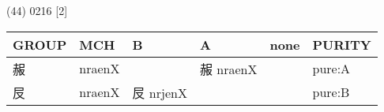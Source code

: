 \documentclass[14pt,a4paper]{scrartcl}
\begin{document}
(44) 0216 {[}2{]}

\begin{longtable}[c]{@{}llllll@{}}
\toprule
\begin{minipage}[b]{0.14\columnwidth}\raggedright\strut
GROUP
\strut\end{minipage} &
\begin{minipage}[b]{0.14\columnwidth}\raggedright\strut
MCH
\strut\end{minipage} &
\begin{minipage}[b]{0.14\columnwidth}\raggedright\strut
B
\strut\end{minipage} &
\begin{minipage}[b]{0.14\columnwidth}\raggedright\strut
A
\strut\end{minipage} &
\begin{minipage}[b]{0.14\columnwidth}\raggedright\strut
none
\strut\end{minipage} &
\begin{minipage}[b]{0.14\columnwidth}\raggedright\strut
PURITY
\strut\end{minipage}\tabularnewline
\midrule
\endhead
\begin{minipage}[t]{0.14\columnwidth}\raggedright\strut
赧
\strut\end{minipage} &
\begin{minipage}[t]{0.14\columnwidth}\raggedright\strut
nraenX
\strut\end{minipage} &
\begin{minipage}[t]{0.14\columnwidth}\raggedright\strut
\strut\end{minipage} &
\begin{minipage}[t]{0.14\columnwidth}\raggedright\strut
赧 nraenX
\strut\end{minipage} &
\begin{minipage}[t]{0.14\columnwidth}\raggedright\strut
\strut\end{minipage} &
\begin{minipage}[t]{0.14\columnwidth}\raggedright\strut
pure:A
\strut\end{minipage}\tabularnewline
\begin{minipage}[t]{0.14\columnwidth}\raggedright\strut
㞋
\strut\end{minipage} &
\begin{minipage}[t]{0.14\columnwidth}\raggedright\strut
nraenX
\strut\end{minipage} &
\begin{minipage}[t]{0.14\columnwidth}\raggedright\strut
㞋 nrjenX
\strut\end{minipage} &
\begin{minipage}[t]{0.14\columnwidth}\raggedright\strut
\strut\end{minipage} &
\begin{minipage}[t]{0.14\columnwidth}\raggedright\strut
\strut\end{minipage} &
\begin{minipage}[t]{0.14\columnwidth}\raggedright\strut
pure:B
\strut\end{minipage}\tabularnewline
\bottomrule
\end{longtable}
\end{document}

